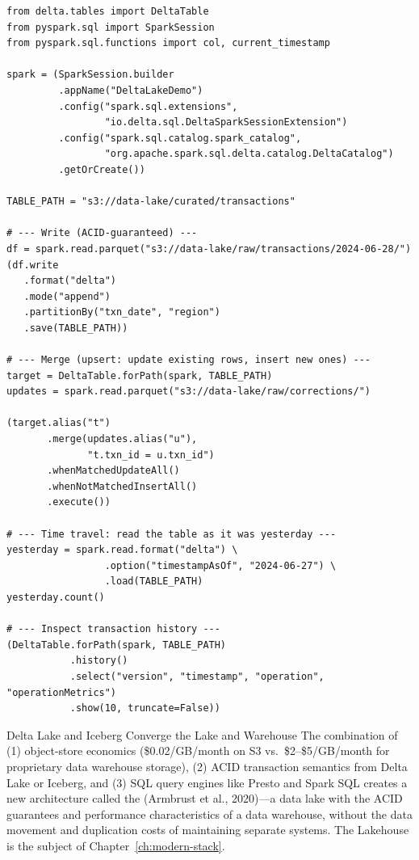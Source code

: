 \begin{lstlisting}[style=pyspark, caption={Delta Lake: ACID writes, time travel, and schema evolution}]
from delta.tables import DeltaTable
from pyspark.sql import SparkSession
from pyspark.sql.functions import col, current_timestamp

spark = (SparkSession.builder
         .appName("DeltaLakeDemo")
         .config("spark.sql.extensions",
                 "io.delta.sql.DeltaSparkSessionExtension")
         .config("spark.sql.catalog.spark_catalog",
                 "org.apache.spark.sql.delta.catalog.DeltaCatalog")
         .getOrCreate())

TABLE_PATH = "s3://data-lake/curated/transactions"

# --- Write (ACID-guaranteed) ---
df = spark.read.parquet("s3://data-lake/raw/transactions/2024-06-28/")
(df.write
   .format("delta")
   .mode("append")
   .partitionBy("txn_date", "region")
   .save(TABLE_PATH))

# --- Merge (upsert: update existing rows, insert new ones) ---
target = DeltaTable.forPath(spark, TABLE_PATH)
updates = spark.read.parquet("s3://data-lake/raw/corrections/")

(target.alias("t")
       .merge(updates.alias("u"),
              "t.txn_id = u.txn_id")
       .whenMatchedUpdateAll()
       .whenNotMatchedInsertAll()
       .execute())

# --- Time travel: read the table as it was yesterday ---
yesterday = spark.read.format("delta") \
                 .option("timestampAsOf", "2024-06-27") \
                 .load(TABLE_PATH)
yesterday.count()

# --- Inspect transaction history ---
(DeltaTable.forPath(spark, TABLE_PATH)
           .history()
           .select("version", "timestamp", "operation", "operationMetrics")
           .show(10, truncate=False))
\end{lstlisting}

\begin{keyinsight}{Delta Lake and Iceberg Converge the Lake and Warehouse}
The combination of (1) object-store economics (\$0.02/GB/month on S3 vs.\
\$2--\$5/GB/month for proprietary data warehouse storage), (2) ACID
transaction semantics from Delta Lake or Iceberg, and (3) SQL query
engines like Presto and Spark SQL creates a new architecture called the
\term{Lakehouse} (Armbrust et al., 2020)---a data lake with the ACID
guarantees and performance characteristics of a data warehouse, without
the data movement and duplication costs of maintaining separate systems.
The Lakehouse is the subject of Chapter~\ref{ch:modern-stack}.
\end{keyinsight}

